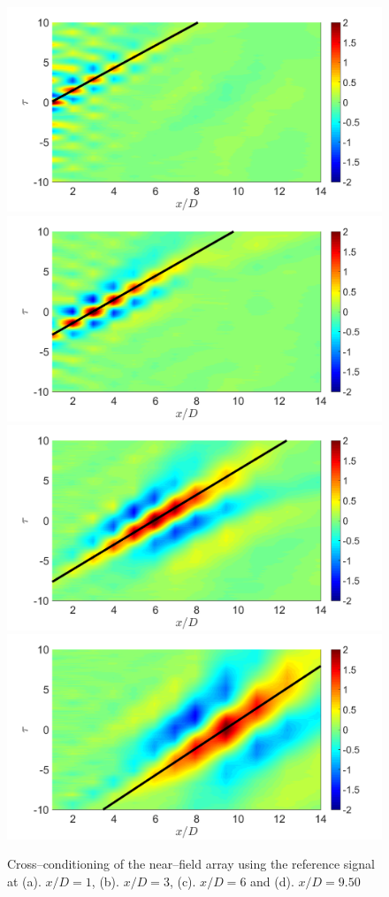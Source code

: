 \begin{figure}
	\centering
			\includegraphics[width=0.45\linewidth]{Figures/conditioning/crossCondSt0p00X1DU0p7112.png}%
			\includegraphics[width=0.45\linewidth]{Figures/conditioning/crossCondSt0p00X3DU0p6806.png}\\
			\includegraphics[width=0.45\linewidth]{Figures/conditioning/crossCondSt0p00X6DU0p6430.png}%
			\includegraphics[width=0.45\linewidth]{Figures/conditioning/crossCondSt0p00X9p5DU0p5873.png}
	\caption{Cross--conditioning of the near--field array using the reference signal at (a). $x/D = 1$, (b). $x/D=3$, (c). $x/D=6$ and (d). $x/D=9.50$}
	\label{fig:crossCondSt0p00}
\end{figure}
